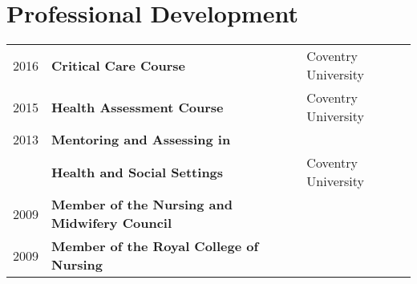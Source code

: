 \documentclass[a4paper,10pt]{article}
\begin{document}
\section{Professional Development}
\begin{tabular}{p{1.35cm}p{8cm}l}	
 \textsc{2016} & \textbf{Critical Care Course} & Coventry University   \\
 \textsc{2015} & \textbf{Health Assessment Course}  &  Coventry University   \\
 \textsc{2013} & \textbf{Mentoring and Assessing in } \\ 
                         & \textbf{Health and Social Settings} &  Coventry University \\
 \textsc{2009} & \textbf{Member of the Nursing and Midwifery Council} \\
 \textsc{2009} & \textbf{Member of the Royal College of Nursing} \\
\end{tabular}

\end{document}
